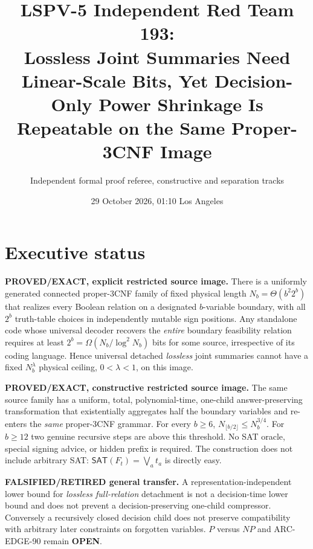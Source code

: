 \documentclass[11pt]{article}
\title{LSPV-5 Independent Red Team 193:\\ Lossless Joint Summaries Need Linear-Scale Bits, Yet Decision-Only Power Shrinkage Is Repeatable on the Same Proper-3CNF Image}
\author{Independent formal proof referee, constructive and separation tracks}
\date{29 October 2026, 01:10 Los Angeles}
\newcommand{\SAT}{\mathsf{SAT}}
\begin{document}
\maketitle
\section*{Executive status}
\textbf{PROVED/EXACT, explicit restricted source image.} There is a uniformly generated connected proper-3CNF family of fixed physical length $N_b=\Theta(b^2 2^b)$ that realizes every Boolean relation on a designated $b$-variable boundary, with all $2^b$ truth-table choices in independently mutable sign positions. Any standalone code whose universal decoder recovers the \emph{entire} boundary feasibility relation requires at least $2^b=\Omega(N_b/\log^2N_b)$ bits for some source, irrespective of its coding language. Hence universal detached \emph{lossless} joint summaries cannot have a fixed $N_b^\lambda$ physical ceiling, $0<\lambda<1$, on this image.

\textbf{PROVED/EXACT, constructive restricted source image.} The same source family has a uniform, total, polynomial-time, one-child answer-preserving transformation that existentially aggregates half the boundary variables and re-enters the \emph{same} proper-3CNF grammar. For every $b\ge6$, $N_{\lfloor b/2\rfloor}\le N_b^{3/4}$. For $b\ge12$ two genuine recursive steps are above this threshold. No SAT oracle, special signing advice, or hidden prefix is required. The construction does not include arbitrary SAT: $\SAT(F_t)=\bigvee_a t_a$ is directly easy.

\textbf{FALSIFIED/RETIRED general transfer.} A representation-independent lower bound for \emph{lossless full-relation} detachment is not a decision-time lower bound and does not prevent a decision-preserving one-child compressor. Conversely a recursively closed decision child does not preserve compatibility with arbitrary later constraints on forgotten variables. $P$ versus $NP$ and ARC-EDGE-90 remain \textbf{OPEN}.
\end{document}
